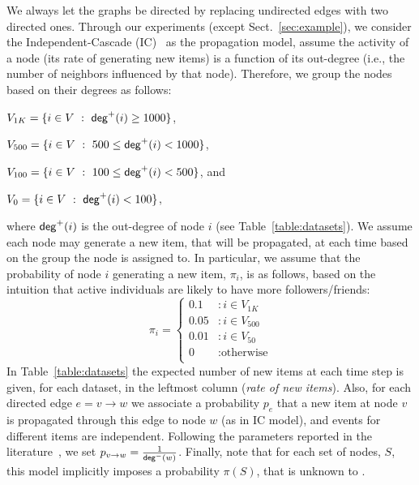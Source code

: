 We always let the graphs be directed by replacing undirected edges with two
directed ones. Through our experiments (except Sect.~\ref{sec:example}), we
consider the Independent-Cascade (IC)~\cite{Kempe2003} as the propagation model,
assume the activity of a node (its rate of generating new items) is a function
of its out-degree (i.e., the number of neighbors influenced by that node).
Therefore, we group the nodes based on their degrees as follows:
\begin{itemize*}
 \item $V_{1K} = \{i\in V ~:~ \mathsf{deg}^+(i) \geq 1000\}$,
 \item $V_{500}  = \{i\in V ~:~ 500\leq \mathsf{deg}^+(i) < 1000\}$,
 \item $V_{100}  = \{i\in V ~:~ 100\leq \mathsf{deg}^+(i) < 500\}$, and
 \item $V_{0}    = \{i\in V ~:~ \mathsf{deg}^+(i) < 100\}$,
\end{itemize*}
where $\mathsf{deg}^+(i)$ is the out-degree of node $i$ (see Table~\ref{table:datasets}).
We assume each node may generate a new item, that will be propagated, at each
time based on the group the node is assigned to. In particular, we assume that
the probability of  node $i$ generating a new item, $\pi_i$, is as follows,
based on the intuition that active individuals are  likely to have more
followers/friends:
$$
   \pi_i = \left\{
     \begin{array}{ll}
       0.1 &: i \in V_{1K}\\
       0.05 &: i \in V_{500} \\
       0.01 &: i \in V_{50} \\
       0 & : \text{otherwise} \\
     \end{array}
   \right.
$$
 In Table~\ref{table:datasets} the expected number of new items at each time
 step is given, for each dataset, in the leftmost column (\emph{rate of new
 items}). Also, for each directed edge $e=v\rightarrow w$ we associate  a probability
$p_e$ that a new item at node $v$ is propagated through this edge to node $w$ (as in IC model),
and events for different items are independent. Following the parameters
reported in the
literature~\cite{Kempe2003,Chen2009,Chen2010,jung2011irie,tang2014influence}, we
set $p_{v\rightarrow w} = \frac{1}{\mathsf{deg}^-(w)}$. Finally, note that for each set of nodes, $S$, this model implicitly imposes a probability $\pi(S)$, that is unknown to \algonameapx.


